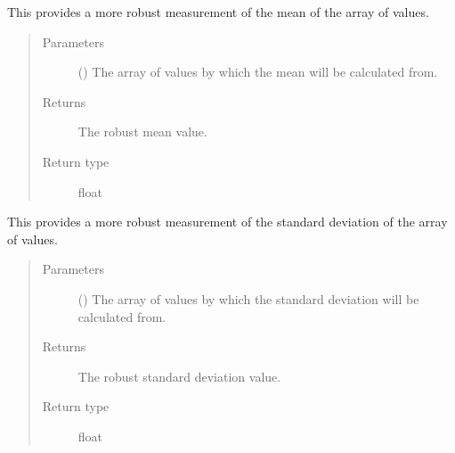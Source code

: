 \documentclass[letterpaper,10pt,english]{sphinxmanual}
\begin{document}
\begin{fulllineitems}
\label{\detokenize{docstrings/ifa_smeargle.core.mathematics:ifa_smeargle.core.mathematics.ifas_robust_mean}}
This provides a more robust measurement of the mean of the
array of values.
\begin{quote}\begin{description}
\item[{Parameters}] \leavevmode
{} () \textendash{} The array of values by which the mean will be
calculated from.

\item[{Returns}] \leavevmode
{} \textendash{} The robust mean value.

\item[{Return type}] \leavevmode
float

\end{description}\end{quote}

\end{fulllineitems}


\begin{fulllineitems}
\label{\detokenize{docstrings/ifa_smeargle.core.mathematics:ifa_smeargle.core.mathematics.ifas_robust_std}}
This provides a more robust measurement of the standard
deviation of the array of values.
\begin{quote}\begin{description}
\item[{Parameters}] \leavevmode
{} () \textendash{} The array of values by which the standard deviation will be
calculated from.

\item[{Returns}] \leavevmode
{} \textendash{} The robust standard deviation value.

\item[{Return type}] \leavevmode
float

\end{description}\end{quote}

\end{fulllineitems}
\end{document}
